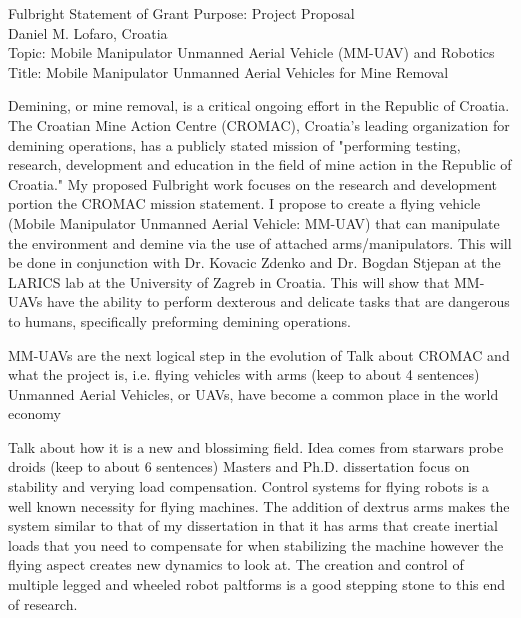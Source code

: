 \documentclass[12pt]{article}
\begin{document}
\begin{center}
Fulbright Statement of Grant Purpose: Project Proposal\\
Daniel M. Lofaro, Croatia\\
Topic: Mobile Manipulator Unmanned Aerial Vehicle (MM-UAV) and Robotics\\
Title: Mobile Manipulator Unmanned Aerial Vehicles for Mine Removal\\

\end{center}

Demining, or mine removal, is a critical ongoing effort in the Republic of Croatia.  The Croatian Mine 
Action Centre (CROMAC), Croatia's leading organization for demining operations, has a publicly stated 
mission of "performing testing, research, development and education in the field of mine action in the 
Republic of Croatia."  My proposed Fulbright work focuses on the research and development portion 
the CROMAC mission statement.  I propose to create a flying vehicle (Mobile Manipulator Unmanned 
Aerial Vehicle: MM-UAV) that can manipulate the environment and demine via the use of attached 
arms/manipulators.  This will be done in conjunction with Dr. Kovacic Zdenko and Dr. Bogdan Stjepan 
at the LARICS lab at the University of Zagreb in Croatia.  This will show that MM-UAVs have the ability 
to perform dexterous and delicate tasks that are dangerous to humans, specifically preforming 
demining operations.

MM-UAVs are the next logical step in the evolution of 
Talk about CROMAC and what the project is, i.e. flying vehicles with arms (keep to about 4 sentences)
Unmanned Aerial Vehicles, or UAVs, have become a common place in the world economy


Talk about how it is a new and blossiming field.  Idea comes from starwars probe droids (keep to about 
6 sentences)
Masters and Ph.D. dissertation focus on stability and verying load compensation.  Control systems for flying 
robots is a  well known necessity for flying machines.  The addition of dextrus arms makes the system similar 
to that of my dissertation in that it has arms that create inertial loads that you need to compensate for when 
stabilizing the machine however the flying aspect creates new dynamics to look at.  The creation and control 
of multiple legged and wheeled robot paltforms is a good stepping stone to this end of research.  
\end{document}
